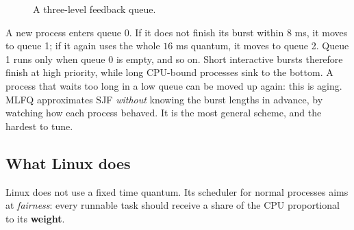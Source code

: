 \documentclass[11pt,a4paper]{article}
\newcommand{\term}[1]{\textbf{\color{mintdeep}#1}}
\begin{document}
\begin{figure}[H]
\centering
{}
\caption{A three-level feedback queue.}
\end{figure}

A new process enters queue 0. If it does not finish its burst within $8$ ms, it moves to queue 1; if it again uses the whole $16$ ms quantum, it moves to queue 2. Queue 1 runs only when queue 0 is empty, and so on. Short interactive bursts therefore finish at high priority, while long CPU-bound processes sink to the bottom. A process that waits too long in a low queue can be moved up again: this is aging. MLFQ approximates SJF \emph{without} knowing the burst lengths in advance, by watching how each process behaved. It is the most general scheme, and the hardest to tune.

\subsection{What Linux does}

Linux does not use a fixed time quantum. Its scheduler for normal processes aims at \emph{fairness}: every runnable task should receive a share of the CPU proportional to its \term{weight}.
\end{document}
